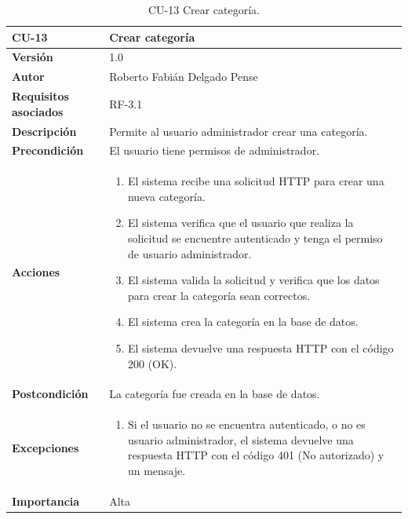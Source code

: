 \begin{table}[p]
	\centering
	\begin{tabularx}{\linewidth}{ p{} p{} }
		\toprule
		\textbf{CU-13}    & \textbf{Crear categoría}\\
		\toprule
		\textbf{Versión}              & 1.0    \\
		\textbf{Autor}                & Roberto Fabián Delgado Pense \\
		\textbf{Requisitos asociados} & RF-3.1 \\ 
		\textbf{Descripción}          & Permite al usuario administrador crear una categoría. \\
		\textbf{Precondición}         & El usuario tiene permisos de administrador. \\
		\textbf{Acciones}             &
		\begin{enumerate}
			\def\labelenumi{\arabic{enumi}.}
			\tightlist
			\item El sistema recibe una solicitud HTTP para crear una nueva categoría.
                \item El sistema verifica que el usuario que realiza la solicitud se encuentre autenticado y tenga el permiso de usuario administrador.
			\item El sistema valida la solicitud y verifica que los datos para crear la categoría sean correctos.
                \item El sistema crea la categoría en la base de datos.
                \item El sistema devuelve una respuesta HTTP con el código 200 (OK).
            \end{enumerate}\\
		\textbf{Postcondición}        & La categoría fue creada en la base de datos.\\
		\textbf{Excepciones}          & 
            \begin{enumerate}
			\def\labelenumi{\arabic{enumi}.}
			\tightlist
   			\item Si el usuario no se encuentra autenticado, o no es usuario administrador, el sistema devuelve una                 respuesta HTTP con el código 401 (No autorizado) y un mensaje.
            \end{enumerate}\\
		\textbf{Importancia}          & Alta \\
		\bottomrule
	\end{tabularx}
	\caption{CU-13 Crear categoría.}
\end{table}

